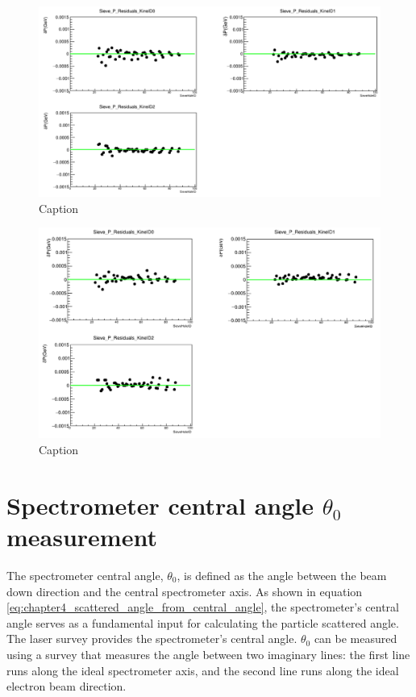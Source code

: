 \begin{figure}[h]
    \centering
    \includegraphics[width =\textwidth]{images/chap4/lhrs_dp_residual.png}
    \caption{Caption}
    \label{fig:lhrs_dp_residual}
\end{figure}


\begin{figure}[h]
    \centering
    \includegraphics[width =\textwidth]{images/chap4/rhrs_dp_residual.png}
    \caption{Caption}
    \label{fig:rhrs_dp_residual}
\end{figure}

\section{Spectrometer central angle $\theta_0$ measurement }

The spectrometer central angle, $\theta_0$, is defined as the angle between the beam down direction and the central spectrometer axis. As shown in equation \ref{eq:chapter4_scattered_angle_from_central_angle}, the spectrometer's central angle serves as a fundamental input for calculating the particle scattered angle. The laser survey provides the spectrometer's central angle. $\theta_0$ can be measured using a survey that measures the angle between two imaginary lines: the first line runs along the ideal spectrometer axis, and the second line runs along the ideal electron beam direction.

